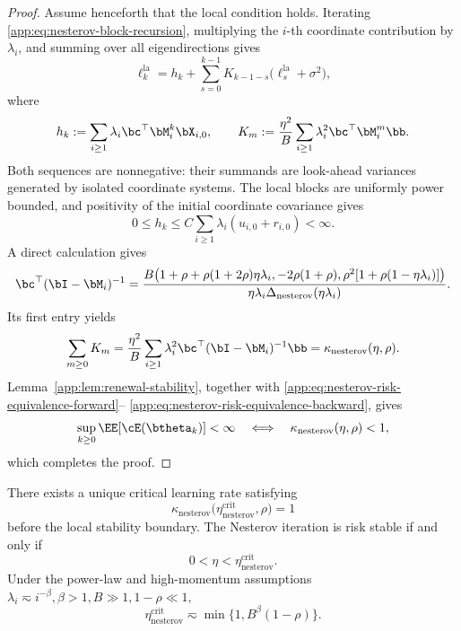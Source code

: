 \documentclass[11pt]{article}
\newcommand{\nesterov}{\mathrm{nesterov}}
\newcommand{\crit}{\mathrm{crit}}
\newcommand{\la}{\mathrm{la}}
\begin{document}
\begin{proof}
Assume henceforth that the local condition holds. Iterating
\eqref{app:eq:nesterov-block-recursion}, multiplying the \(i\)-th coordinate contribution by \(\lambda_i\), and summing over all
eigendirections gives
\begin{equation}
\label{app:eq:nesterov-renewal}
\ell_k^{\la}
=
h_k
+
\sum_{s=0}^{k-1}
K_{k-1-s}\bigl(\ell_s^{\la}+\sigma^2\bigr),
\end{equation}
where
\[
h_k
:=
\sum_{i\geq1}
\lambda_i\bc^\top\bM_i^k\bX_{i,0},
\qquad
K_m
:=
\frac{\eta^2}{B}
\sum_{i\geq1}
\lambda_i^2\bc^\top\bM_i^m\bb.
\]
Both sequences are nonnegative: their summands are look-ahead variances generated by isolated
coordinate systems. The local blocks are uniformly power bounded, and positivity of the initial
coordinate covariance gives
\[
0\leq h_k
\leq
C\sum_{i\geq1}\lambda_i(u_{i,0}+r_{i,0})
<\infty.
\]
A direct calculation gives
\begin{equation}
\label{app:eq:nesterov-resolvent}
\bc^\top(\bI-\bM_i)^{-1}
=
\frac{
B\bigl(
1+\rho+\rho(1+2\rho)\eta\lambda_i,
-2\rho(1+\rho),
\rho^2[1+\rho(1-\eta\lambda_i)]
\bigr)
}{
\eta\lambda_i\Delta_{\nesterov}(\eta\lambda_i)
}.
\end{equation}
Its first entry yields
\[
\sum_{m\geq0}K_m
=
\frac{\eta^2}{B}
\sum_{i\geq1}
\lambda_i^2\bc^\top(\bI-\bM_i)^{-1}\bb
=
\kappa_{\nesterov}(\eta,\rho).
\]
Lemma~\ref{app:lem:renewal-stability}, together with
\eqref{app:eq:nesterov-risk-equivalence-forward}--
\eqref{app:eq:nesterov-risk-equivalence-backward}, gives
\[
\sup_{k\geq0}\EE[\cE(\btheta_k)]<\infty
\quad\Longleftrightarrow\quad
\kappa_{\nesterov}(\eta,\rho)<1,
\]
which completes the proof.

\end{proof}

\begin{corollary}
\label{app:cor:nesterov-critical-rate}
There exists a unique critical learning rate satisfying
\[
\kappa_{\nesterov}
\bigl(\eta_{\nesterov}^{\crit},\rho\bigr)
=1
\]
before the local stability boundary. The Nesterov iteration is risk stable if and only if
\[
0<\eta<\eta_{\nesterov}^{\crit}.
\]
Under the power-law and high-momentum assumptions
\(
\lambda_i\eqsim i^{-\beta},
\beta>1,
B\gg1,
1-\rho\ll1,
\)
\begin{equation}
\label{app:eq:nesterov-critical-scaling}
\eta_{\nesterov}^{\crit}
\eqsim
\min\{1,B^\beta(1-\rho)\}.
\end{equation}
\end{corollary}
\end{document}
